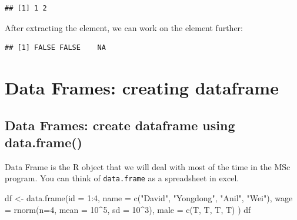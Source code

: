 \documentclass[
  11pt,
]{book}
\newenvironment{Shaded}{\begin{snugshade}}{\end{snugshade}}
\newcommand{\AttributeTok}[1]{\textcolor[rgb]{0.77,0.63,0.00}{#1}}
\newcommand{\DecValTok}[1]{\textcolor[rgb]{0.00,0.00,0.81}{#1}}
\newcommand{\FunctionTok}[1]{\textcolor[rgb]{0.00,0.00,0.00}{#1}}
\newcommand{\NormalTok}[1]{#1}
\newcommand{\OtherTok}[1]{\textcolor[rgb]{0.56,0.35,0.01}{#1}}
\newcommand{\SpecialCharTok}[1]{\textcolor[rgb]{0.00,0.00,0.00}{#1}}
\newcommand{\StringTok}[1]{\textcolor[rgb]{0.31,0.60,0.02}{#1}}
\begin{document}
\begin{verbatim}
## [1] 1 2
\end{verbatim}

After extracting the element, we can work on the element further:

\begin{Shaded}
\end{Shaded}

\begin{verbatim}
## [1] FALSE FALSE    NA
\end{verbatim}

\hypertarget{data-frames-creating-dataframe}{%
\section{Data Frames: creating dataframe}\label{data-frames-creating-dataframe}}

\hypertarget{data-frames-create-dataframe-using-data.frame}{%
\subsection{Data Frames: create dataframe using data.frame()}\label{data-frames-create-dataframe-using-data.frame}}

Data Frame is the R object that we will deal with most of the time in the MSc program. You can think of \texttt{data.frame} as a spreadsheet in excel.

\begin{Shaded}
\begin{Highlighting}[]
\NormalTok{df }\OtherTok{\textless{}{-}}  \FunctionTok{data.frame}\NormalTok{(}\AttributeTok{id =} \DecValTok{1}\SpecialCharTok{:}\DecValTok{4}\NormalTok{,}
  \AttributeTok{name =} \FunctionTok{c}\NormalTok{(}\StringTok{"David"}\NormalTok{, }\StringTok{"Yongdong"}\NormalTok{, }\StringTok{"Anil"}\NormalTok{, }\StringTok{"Wei"}\NormalTok{),}
  \AttributeTok{wage =} \FunctionTok{rnorm}\NormalTok{(}\AttributeTok{n=}\DecValTok{4}\NormalTok{, }\AttributeTok{mean =} \DecValTok{10}\SpecialCharTok{\^{}}\DecValTok{5}\NormalTok{, }\AttributeTok{sd =} \DecValTok{10}\SpecialCharTok{\^{}}\DecValTok{3}\NormalTok{), }
  \AttributeTok{male =} \FunctionTok{c}\NormalTok{(T, T, T, T)}
\NormalTok{  )}
\NormalTok{df}
\end{Highlighting}
\end{Shaded}
\end{document}
